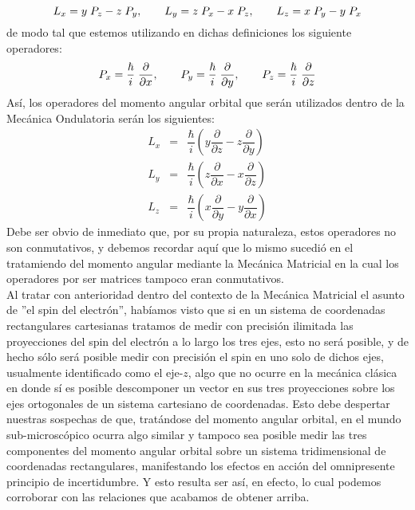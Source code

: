 \[ L_{x} = y \; P_{z} - z \; P_{y}, \hspace{0.7cm} L_{y} = z \; P_{x} - x \; P_{z}, \hspace{0.7cm} L_{z} = x \; P_{y} - y \; P_{x} \]
de modo tal que estemos utilizando en dichas definiciones los siguiente operadores:
\[ P_{x} = \dfrac{\hbar}{i} \; \dfrac{\partial}{\partial x}, \hspace{0.7cm} P_{y} = \dfrac{\hbar}{i} \; \dfrac{\partial}{\partial y}, \hspace{0.7cm} P_{z} = \dfrac{\hbar}{i} \; \dfrac{\partial}{\partial z} \]
Así, los operadores del momento angular orbital que serán utilizados dentro de la Mecánica Ondulatoria serán los siguientes:
\begin{eqnarray*}
L_{x} &=& \dfrac{\hbar}{i} \left( y \dfrac{\partial}{\partial z} - z \dfrac{\partial}{\partial y} \right) \nonumber \\
L_{y} &=& \dfrac{\hbar}{i} \left( z \dfrac{\partial}{\partial x} - x \dfrac{\partial}{\partial z} \right) \nonumber \\
L_{z} &=& \dfrac{\hbar}{i} \left( x \dfrac{\partial}{\partial y} - y \dfrac{\partial}{\partial x} \right) \nonumber 
\end{eqnarray*}
Debe ser obvio de inmediato que, por su propia naturaleza, estos operadores no son conmutativos, y debemos recordar aquí que lo mismo sucedió en el tratamiendo del momento angular mediante la Mecánica Matricial en la cual los operadores por ser matrices tampoco eran conmutativos.
\\
Al tratar con anterioridad dentro del contexto de la Mecánica Matricial el asunto de ''el spin del electrón'', habíamos visto que si en un sistema de coordenadas rectangulares cartesianas tratamos de medir con precisión ilimitada las proyecciones del spin del electrón a lo largo los tres ejes, esto no será posible, y de hecho sólo será posible medir con precisión el spin en uno solo de dichos ejes, usualmente identificado como el eje-$z$, algo que no ocurre en la mecánica clásica en donde sí es posible descomponer un vector en sus tres proyecciones sobre los ejes ortogonales de un sistema cartesiano de coordenadas. Esto debe despertar nuestras sospechas de que, tratándose del momento angular orbital, en el mundo sub-microscópico ocurra algo similar y tampoco sea posible medir las tres componentes del momento angular orbital sobre un sistema tridimensional de coordenadas rectangulares, manifestando los efectos en acción del omnipresente principio de incertidumbre. Y esto resulta ser así, en efecto, lo cual podemos corroborar con las relaciones que acabamos de obtener arriba.

